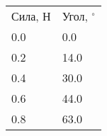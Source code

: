 \begin{tabular}{ll}
\hline
 Сила, Н & Угол, $^\circ$ \\
 0.0     & 0.0            \\
 0.2     & 14.0           \\
 0.4     & 30.0           \\
 0.6     & 44.0           \\
 0.8     & 63.0           \\
\hline
\end{tabular}